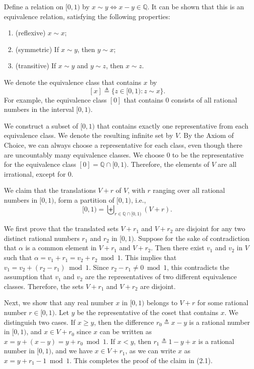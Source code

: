 Define a relation on $[0,1)$ by $x\sim y \Longleftrightarrow x-y\in \mathbb{Q}$. It can be shown that this is an equivalence relation, satisfying the following properties:
\begin{enumerate}[label=(\roman*)]
    \item (reflexive) $x\sim x$;
    \item (symmetric) If $x\sim y$, then $y\sim x$;
    \item (transitive) If $x\sim y$ and $y\sim z$, then $x\sim z$.
\end{enumerate}

We denote the equivalence class that contains $x$ by
\[
[x] \triangleq \{z\in [0,1) : z\sim x\}.
\]
For example, the equivalence class $[0]$ that contains $0$ consists of all rational numbers in the interval $[0,1)$.

We construct a subset of $[0,1)$ that contains exactly one representative from each equivalence class. We denote the resulting infinite set by $V$. By the Axiom of Choice, we can always choose a representative for each class, even though there are uncountably many equivalence classes. We choose $0$ to be the representative for the equivalence class $[0]=\mathbb{Q}\cap [0,1)$. Therefore, the elements of $V$ are all irrational, except for $0$.

We claim that the translations $V+r$ of $V$, with $r$ ranging over all rational numbers in $[0,1)$, form a partition of $[0,1)$, i.e.,
\begin{equation}
[0,1)=\biguplus_{r\in \mathbb{Q}\cap [0,1)} (V+r).
\tag{2.1}
\end{equation}

We first prove that the translated sets $V+r_1$ and $V+r_2$ are disjoint for any two distinct rational numbers $r_1$ and $r_2$ in $[0,1)$. Suppose for the sake of contradiction that $\alpha$ is a common element in $V+r_1$ and $V+r_2$. Then there exist $v_1$ and $v_2$ in $V$ such that $\alpha=v_1+r_1=v_2+r_2 \bmod 1$. This implies that $v_1=v_2+(r_2-r_1)\bmod 1$. Since $r_2-r_1\neq 0 \bmod 1$, this contradicts the assumption that $v_1$ and $v_2$ are the representatives of two different equivalence classes. Therefore, the sets $V+r_1$ and $V+r_2$ are disjoint.

Next, we show that any real number $x$ in $[0,1)$ belongs to $V+r$ for some rational number $r\in [0,1)$. Let $y$ be the representative of the coset that contains $x$. We distinguish two cases. If $x\ge y$, then the difference $r_0\triangleq x-y$ is a rational number in $[0,1)$, and $x\in V+r_0$ since $x$ can be written as $x=y+(x-y)=y+r_0 \bmod 1$. If $x<y$, then $r_1\triangleq 1-y+x$ is a rational number in $[0,1)$, and we have $x\in V+r_1$, as we can write $x$ as $x=y+r_1-1 \bmod 1$. This completes the proof of the claim in (2.1).


